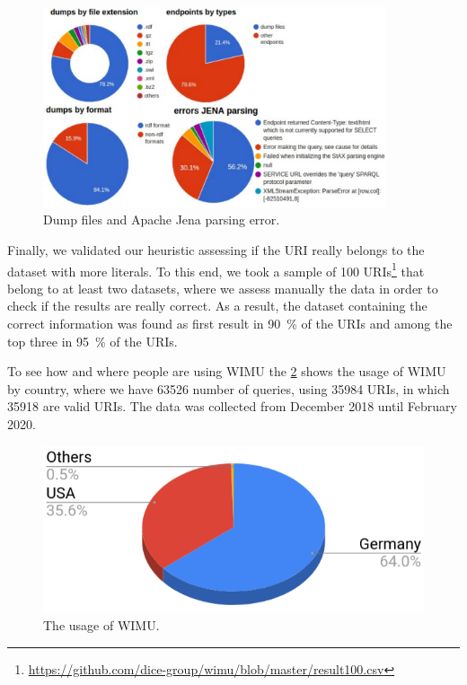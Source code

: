 \documentclass[sw]{iosart2x}
\begin{document}
\begin{figure}[htp] 
	\centering
	\includegraphics[width=0.9\textwidth]{img/dumps3.pdf}
	\caption{Dump files and Apache Jena parsing error.}
	\label{fig:dumps}
\end{figure}

Finally, we validated our heuristic assessing if the URI really belongs to the dataset with more literals.
To this end, we took a sample of 100 URIs\footnote{\url{https://github.com/dice-group/wimu/blob/master/result100.csv}} that belong to at least two datasets, where we assess manually the data in order to check if the results are really correct. 
As a result, the dataset containing the correct information was found as first result in \SI{90}{\percent} of the URIs and among the top three in \SI{95}{\percent} of the URIs.

To see how and where people are using WIMU the \cref{fig:wimuUsage} shows the usage of WIMU by country, where we have \num{63526} number of queries, using \num{35984} URIs, in which \num{35918} are valid URIs. The data was collected from December 2018 until February 2020. 

\begin{figure}[htp] 
	\centering
	\includegraphics[width=\linewidth]{img/wimuUsage.png}
	\caption{The usage of WIMU.}
	\label{fig:wimuUsage}
\end{figure}
\end{document}
